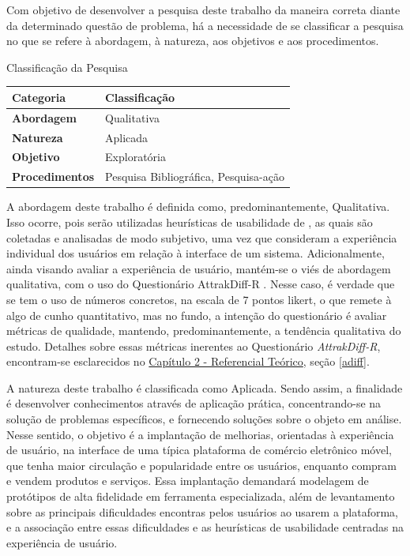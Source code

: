 Com objetivo de desenvolver a pesquisa deste trabalho da maneira correta diante da determinado questão de problema, há a necessidade de se classificar a pesquisa no que se refere à abordagem, à natureza, aos objetivos e aos procedimentos.

\begin{quadro}
\caption{\label{ClassificacaoPesquisTCC}Classificação da Pesquisa}
\centering

\begin{tabular}{|l|l|}
\hline
\textbf{Categoria}     & \textbf{Classificação}                \\ \hline
\textbf{Abordagem}     & Qualitativa                           \\ \hline
\textbf{Natureza}      & Aplicada                              \\ \hline
\textbf{Objetivo}      & Exploratória                          \\ \hline
\textbf{Procedimentos} & Pesquisa Bibliográfica, Pesquisa-ação \\ \hline
\end{tabular}

\end{quadro} 

A abordagem deste trabalho é definida como, predominantemente, Qualitativa. Isso ocorre, pois serão utilizadas heurísticas de usabilidade de , as quais são coletadas e analisadas de modo subjetivo, uma vez que consideram a experiência individual dos usuários em relação à interface de um sistema. Adicionalmente, ainda visando avaliar a experiência de usuário, mantém-se o viés de abordagem qualitativa, com o uso do Questionário AttrakDiff-R \cite{AttrakDiff}. Nesse caso, é verdade que se tem o uso de números concretos, na escala de 7 pontos likert, o que remete à algo de cunho quantitativo, mas no fundo, a intenção do questionário é avaliar métricas de qualidade, mantendo, predominantemente, a tendência qualitativa do estudo. Detalhes sobre essas métricas inerentes ao Questionário \textit{AttrakDiff-R}, encontram-se esclarecidos no \hyperref[chap:ReferencialTeorico]{Capítulo 2 - Referencial Teórico}, seção \ref{adiff}.

A natureza deste trabalho é classificada como Aplicada. Sendo assim, a finalidade é desenvolver conhecimentos através de aplicação prática, concentrando-se na solução de problemas específicos, e fornecendo soluções sobre o objeto em análise. Nesse sentido, o objetivo é a implantação de melhorias, orientadas à experiência de usuário, na interface de uma típica plataforma de comércio eletrônico móvel, que tenha maior circulação e popularidade entre os usuários, enquanto compram e vendem produtos e serviços. Essa implantação demandará modelagem de protótipos de alta fidelidade em ferramenta especializada, além de levantamento sobre as principais dificuldades encontras pelos usuários ao usarem a plataforma, e a associação entre essas dificuldades e as heurísticas de usabilidade centradas na experiência de usuário.

